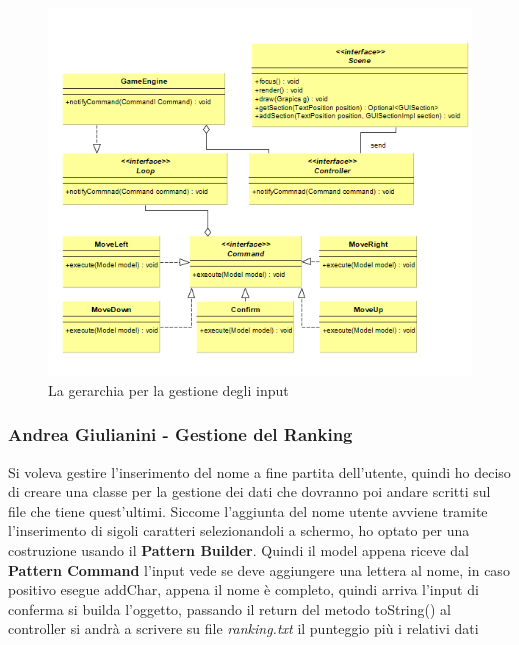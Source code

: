 \documentclass[a4paper,12pt, hidelinks]{report}
\begin{document}
\begin{figure}[H]
\centering{}
\includegraphics[width=\linewidth]{img/PatternCommand}
\caption{La gerarchia per la gestione degli input}
\label{img:GerarchiaSound}
\end{figure}

\begin{flushright}
\item\subsubsection{Andrea Giulianini - Gestione del Ranking}
\end{flushright}

Si voleva gestire l'inserimento del nome a fine partita dell'utente, quindi ho deciso di creare una classe per la gestione dei dati che dovranno poi andare scritti sul file che tiene quest'ultimi. Siccome l'aggiunta del nome utente avviene tramite l'inserimento di sigoli caratteri selezionandoli a schermo, ho optato per una costruzione usando il \textbf{Pattern Builder}. Quindi il model appena riceve dal \textbf{Pattern Command} l'input vede se deve aggiungere una lettera al nome, in caso positivo esegue addChar, appena il nome è completo, quindi arriva l'input di conferma si builda l'oggetto, passando il return del metodo toString() al controller si andrà a scrivere su file \emph{ranking.txt} il punteggio più i relativi dati
\end{document}
